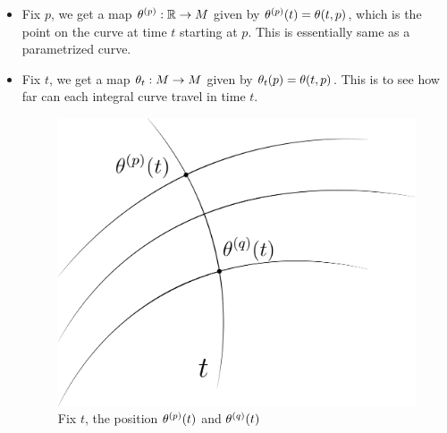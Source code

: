 \begin{itemize}
    \item Fix $p$, we get a map $\theta^{(p)}:\mathbb{R} \to M$ given by $\theta^{(p)}(t) = \theta(t,p)$, which is the point on the curve at time $t$ starting at $p$. This is essentially same as a parametrized curve. 
    \item Fix $t$, we get a map $\theta_t:M \to M$ given by $\theta_t(p) = \theta(t,p)$. This is to see how far can each integral curve travel in time $t$. 
    \begin{figure}[h]
        \centering
        \includegraphics[scale=0.6]{figure/flow.png}
        \caption{Fix $t$, the position $\theta^{(p)}(t)$ and $\theta^{(q)}(t)$}
    \end{figure}
\end{itemize}

